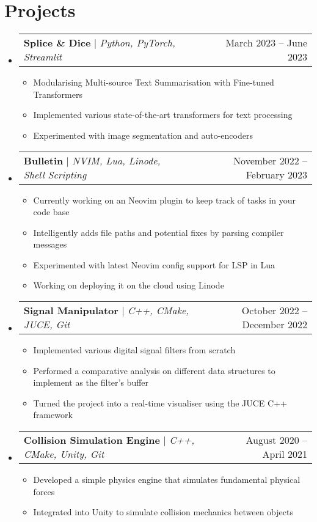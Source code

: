 \documentclass[letterpaper,11pt]{article}
\makeatletter
\newcommand{\resumeItem}[1]{
  \item\small{
    {#1 \vspace{-2pt}}
  }
}
\newcommand{\resumeProjectHeading}[2]{
    \item
    \begin{tabular*}{0.97\textwidth}{l@{\extracolsep{\fill}}r}
      \small#1 & #2 \\
    \end{tabular*}\vspace{-7pt}
}
\newcommand{\resumeSubHeadingListStart}{\begin{itemize}[leftmargin=0.15in, label={}]}
\newcommand{\resumeSubHeadingListEnd}{\end{itemize}}
\newcommand{\resumeItemListStart}{\begin{itemize}}
\newcommand{\resumeItemListEnd}{\end{itemize}\vspace{-5pt}}
\makeatother
\begin{document}
\section{Projects}
    \resumeSubHeadingListStart

    \resumeProjectHeading
          {\textbf{Splice \& Dice} $|$ \emph{Python, PyTorch, Streamlit}}{March 2023 -- June 2023}
          \resumeItemListStart
            \resumeItem{Modularising Multi-source Text Summarisation with Fine-tuned Transformers}
            \resumeItem{Implemented various state-of-the-art transformers for text processing}
            \resumeItem{Experimented with image segmentation and auto-encoders}
          \resumeItemListEnd
    
    \resumeProjectHeading
          {\textbf{Bulletin} $|$ \emph{NVIM, Lua, Linode, Shell Scripting}}{November 2022 -- February 2023}
          \resumeItemListStart
            \resumeItem{Currently working on an Neovim plugin to keep track of tasks in your code base}
            \resumeItem{Intelligently adds file paths and potential fixes by parsing compiler messages}
            \resumeItem{Experimented with latest Neovim config support for LSP in Lua}
            \resumeItem{Working on deploying it on the cloud using Linode}
          \resumeItemListEnd
          
    \resumeProjectHeading
          {\textbf{Signal Manipulator} $|$ \emph{C++, CMake, JUCE, Git}}{October 2022 -- December 2022}
          \resumeItemListStart
            \resumeItem{Implemented various digital signal filters from scratch}
            \resumeItem{Performed a comparative analysis on different data structures to implement as the filter's buffer}
            \resumeItem{Turned the project into a real-time visualiser using the JUCE C++ framework}
          \resumeItemListEnd
          
      \resumeProjectHeading
          {\textbf{Collision Simulation Engine} $|$ \emph{C++, CMake, Unity, Git}}{August 2020 -- April 2021}
          \resumeItemListStart
            \resumeItem{Developed a simple physics engine that simulates fundamental physical forces}
            \resumeItem{Integrated into Unity to simulate collision mechanics between objects}
          \resumeItemListEnd

    \resumeSubHeadingListEnd



%
\end{document}
